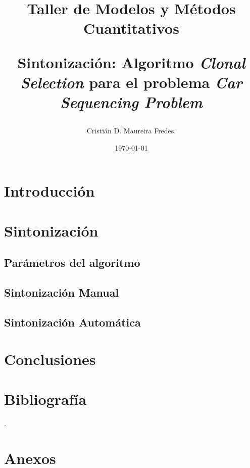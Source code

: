 \documentclass[letter, 10pt]{article}
\begin{document}

\pagestyle{empty}


\title{Taller de Modelos y Métodos Cuantitativos \\ \begin{Large}Sintonización: Algoritmo \emph{Clonal Selection} para el problema \emph{Car Sequencing Problem}\end{Large}}
\author{Cristián D. Maureira Fredes.}
\date{\today}
\maketitle

\section{Introducción}


\section{Sintonización}

\subsection{Parámetros del algoritmo}


\subsection{Sintonización Manual}


\newpage
\subsection{Sintonización Automática}


\section{Conclusiones}


\section{Bibliografía}
.

\newpage
\section{Anexos}

\end{document}
